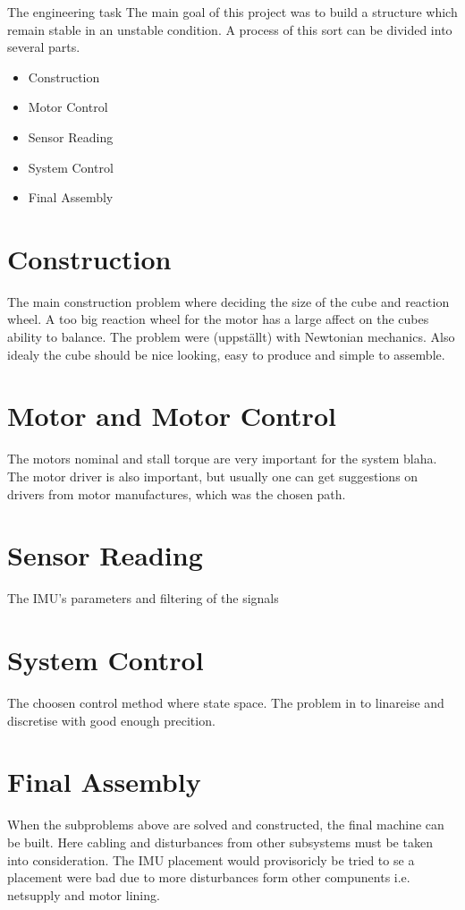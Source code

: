 \documentclass[a4paper,11pt]{kth-mag}
\begin{document}
The engineering task The main goal of this project was to build a structure which remain stable in an unstable condition. A process of this sort can be divided into several parts. 
\begin{itemize}
\item Construction
\item Motor Control
\item Sensor Reading
\item System Control
\item Final Assembly
\end{itemize}

\section{Construction}
The main construction problem where deciding the size of the cube and reaction wheel. A too big reaction wheel for the motor has a large affect on the cubes ability to balance. The problem were (uppställt) with Newtonian mechanics.
Also idealy the cube should be nice looking, easy to produce and simple to assemble. 
 
\section{Motor and Motor Control}
The motors nominal and stall torque are very important for the system blaha. The motor driver is also important, but usually one can get suggestions on drivers from motor manufactures, which was the chosen path.
  
\section{Sensor Reading}
The IMU's parameters and filtering of the signals

\section{System Control}
The choosen control method where state space. The problem in to linareise and discretise with good enough precition.

\section{Final Assembly}
When the subproblems above are solved and constructed, the final machine can be built. Here cabling and disturbances from other subsystems must be taken into consideration. 
The IMU placement would provisoricly be tried to se a placement were bad due to more disturbances form other compunents i.e. netsupply and motor lining.
\end{document}
